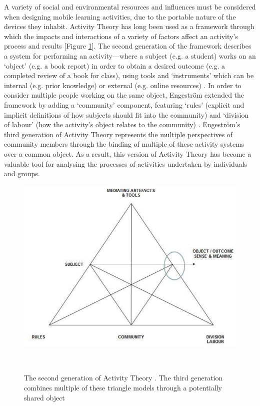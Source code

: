 A variety of social and environmental resources and influences must be considered when designing mobile learning activities, due to the portable nature of the devices they inhabit. Activity Theory has long been used as a framework through which the impacts and interactions of a variety of factors affect an activity’s process and results [Figure \ref{fig:activityTheory}]. The second generation of the framework describes a system for performing an activity---where a subject (e.g. a student) works on an `object' (e.g. a book report) in order to obtain a desired outcome (e.g. a completed review of a book for class), using tools and `instruments' which can be internal (e.g. prior knowledge) or external (e.g. online resources) \citep{leont1978}. In order to consider multiple people working on the same object, Engestr{\"o}m extended the framework by adding a `community' component, featuring `rules' (explicit and implicit definitions of how subjects should fit into the community) and `division of labour' (how the activity's object relates to the community) \citep{Engestrom2001}. Engestr{\"o}m's third generation of Activity Theory represents the multiple perspectives of community members through the binding of multiple of these activity systems over a common object. As a result, this version of Activity Theory has become a valuable tool for analysing the processes of activities undertaken by individuals and groups.

\begin{figure}
\centering
  \includegraphics[width=0.8\columnwidth]{images/chapter03/activityTheory.PNG}
  \caption[Second Generation Activity Theory]{The second generation of Activity Theory \citep{leont1978, Engestrom1987}. The third generation combines multiple of these triangle models through a potentially shared object \citep{Engestrom2001} }~\label{fig:activityTheory}
\end{figure}


